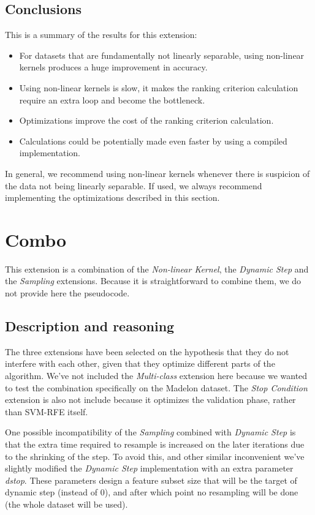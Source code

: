 \subsection{Conclusions}

This is a summary of the results for this extension:

\begin{itemize}
    \item For datasets that are fundamentally not linearly separable, using non-linear kernels produces a huge improvement in accuracy.
    \item Using non-linear kernels is slow, it makes the ranking criterion calculation re\-quire an extra loop and become the bottleneck.
    \item Optimizations improve the cost of the ranking criterion calculation.
    \item Calculations could be potentially made even faster by using a compiled im\-ple\-men\-ta\-tion. 
\end{itemize}

In general, we recommend using non-linear kernels whenever there is suspicion of the data not being linearly separable. If used, we always recommend im\-ple\-ment\-ing the optimizations described in this section.

\section{Combo}

This extension is a combination of the \emph{Non-linear Kernel}, the \emph{Dynamic Step} and the \emph{Sampling} extensions. Because it is straightforward to combine them, we do not provide here the pseudocode.

\subsection{Description and reasoning}

The three extensions have been selected on the hypothesis that they do not interfere with each other, given that they optimize different parts of the algorithm. We've not included the \emph{Multi-class} extension here because we wanted to test the combination specifically on the Madelon dataset. The \emph{Stop Condition} extension is also not include because it optimizes the validation phase, rather than SVM-RFE itself.

One possible incompatibility of the \emph{Sampling} combined with \emph{Dynamic Step} is that the extra time required to resample is increased on the later iterations due to the shrinking of the step. To avoid this, and other similar inconvenient we've slightly modified the \emph{Dynamic Step} implementation with an extra parameter \emph{dstop}. These parameters design a feature subset size that will be the target of dynamic step (instead of 0), and after which point no resampling will be done (the whole dataset will be used).


